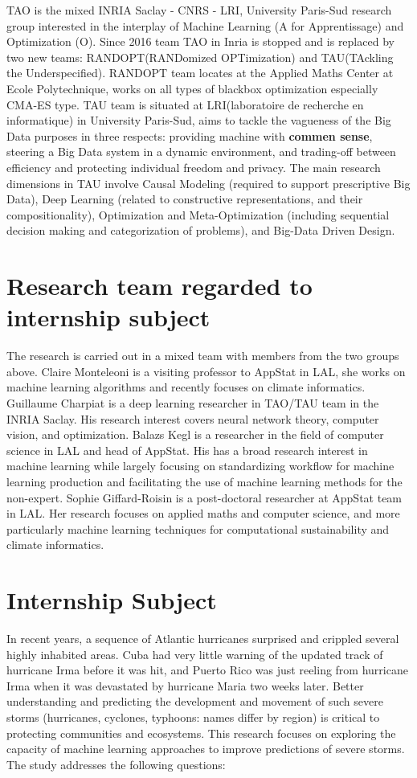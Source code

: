 TAO is the mixed INRIA Saclay - CNRS - LRI, University Paris-Sud research group interested in the interplay of Machine Learning (A for Apprentissage) and Optimization (O). Since 2016 team TAO in Inria is stopped and is replaced by two new teams: RANDOPT(RANDomized OPTimization) and TAU(TAckling the Underspecified). RANDOPT team locates at the Applied Maths Center at Ecole Polytechnique, works on all types of blackbox optimization especially CMA-ES type. TAU team is situated at LRI(laboratoire de recherche en informatique) in University Paris-Sud, aims to tackle the vagueness of the Big Data purposes\cite{TAO} in three respects: providing machine with \textbf{commen sense}, steering a Big Data system in a dynamic environment, and trading-off between efficiency and protecting individual freedom and privacy\cite{TAU}. The main research dimensions in TAU involve Causal Modeling (required to support prescriptive Big Data), Deep Learning (related to constructive representations, and their compositionality), Optimization and Meta-Optimization (including sequential decision making and categorization of problems), and Big-Data Driven Design.


\section{Research team regarded to internship subject}
The research is carried out in a mixed team with members from the two groups above. Claire Monteleoni is a visiting professor to AppStat in LAL, she works on machine learning algorithms and recently focuses on climate informatics. Guillaume Charpiat is a deep learning researcher in TAO/TAU team in the INRIA Saclay. His research interest covers neural network theory, computer vision, and optimization. Balazs Kegl is a researcher in the field of computer science in LAL and head of AppStat. His has a broad research interest in machine learning while largely focusing on standardizing workflow for machine learning production and facilitating the use of machine learning methods for the non-expert. Sophie Giffard-Roisin is a post-doctoral researcher at AppStat team in LAL. Her research focuses on applied maths and computer science, and more particularly machine learning techniques for computational sustainability and climate informatics.  


\section{Internship Subject}
\label{sec:subject}
In recent years, a sequence of Atlantic hurricanes surprised and crippled several highly inhabited areas. Cuba had very little warning of the updated track of hurricane Irma before it
was hit\cite{NYT}, and Puerto Rico was just reeling from hurricane Irma when it was devastated by hurricane Maria two weeks later. Better understanding and predicting the development and movement of such severe storms (hurricanes, cyclones, typhoons: names differ by region) is critical to protecting communities and ecosystems. This research focuses on exploring the capacity of machine learning approaches to improve predictions of severe storms. The study addresses the following questions:


